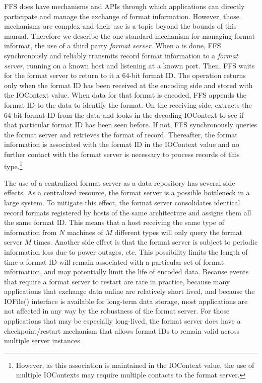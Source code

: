 FFS does have mechanisms and APIs through which applications can directly
participate and manage the exchange of format information.  However, those
mechanisms are complex and their use is a topic beyond the bounds of this
manual.  Therefore we describe the one standard mechanism for managing
format informat, the use of a third party {\it format server}.  When a
 is done, FFS synchronously and
reliably transmits record format information to a {\it format server},
running on a known host and listening at a known port.  Then, FFS waits for
the format server to return to it a 64-bit format ID.  The
 operation returns only when the
format ID has been received at the encoding side and stored with the
IOContext value.  When data for that format is encoded, FFS appends the
format ID to the data to identify the format.  On the receiving side,
 extracts the 64-bit format ID from the
data and looks in the decoding IOContext to see if that particular format ID
has been seen before.  If not, FFS synchronously queries the format server
and retrieves the format of record.  Thereafter, the format information is
associated with the format ID in the IOContext value and no further contact
with the format server is necessary to process records of this
type.\footnote{However, as this association is maintained in the IOContext
value, the use of multiple IOContexts may require multiple contacts to the
format server.}

The use of a centralized format server as a data repository has several side
effects.  As a centralized resource, the format server is a possible
bottleneck in a large system.  To mitigate this effect, the format server
consolidates identical record formats registered by hosts of the same
architecture and assigns them all the same format ID.  This means that a
host receiving the same type of information from $N$ machines of $M$
different types will only query the format server $M$ times.  Another side
effect is that the format server is subject to periodic information loss due
to power outages, etc.  This possibility limits the length of time a format
ID will remain associated with a particular set of format information, and
may potentially limit the life of encoded data.  Because events that require
a format server to restart are rare in practice, because many applications
that exchange data online are relatively short lived, and because 
the IOFile() interface is available for long-term data storage, most
applications are not affected in any way by the robustness of the format
server.  For those applications that may be especially long-lived, the
format server does have a checkpoint/restart mechanism that allows format
IDs to remain valid across multiple server instances.

